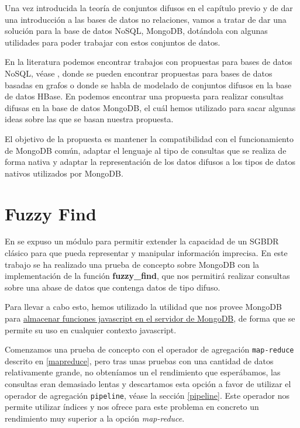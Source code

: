 \label{propuesta}
Una vez introducida la teoría de conjuntos difusos en el capítulo previo y de dar una introducción a las bases de datos no relaciones, vamos a tratar de dar una solución para la base de datos NoSQL, MongoDB, dotándola con algunas utilidades para poder trabajar con estos conjuntos de datos.

En la literatura podemos encontrar trabajos con propuestas para bases de datos NoSQL, véase \cite{fuzzyquerygraph, fuzzyquerygraph2, fuzzyquerygraph3}, donde se pueden encontrar propuestas para bases de datos basadas en grafos o \cite{fuzzyqueryhbase} donde se habla de modelado de conjuntos difusos en la base de datos HBase. En \cite{fuzzyquerymongo} podemos encontrar una propuesta para realizar consultas difusas en la base de datos MongoDB, el cuál hemos utilizado para sacar algunas ideas sobre las que se basan nuestra propuesta.

El objetivo de la propuesta es mantener la compatibilidad con el funcionamiento de MongoDB común, adaptar el lenguaje al tipo de consultas que se realiza de forma nativa y adaptar la representación de los datos difusos a los tipos de datos nativos utilizados por MongoDB.

\section{Fuzzy Find}

En \cite{tesismedina} se expuso un módulo para permitir extender la capacidad de un SGBDR clásico para que pueda representar y manipular información imprecisa. En este trabajo se ha realizado una prueba de concepto sobre MongoDB con la implementación de la función \textbf{fuzzy\_find}, que nos permitirá realizar consultas sobre una abase de datos que contenga datos de tipo difuso.

Para llevar a cabo esto, hemos utilizado la utilidad que nos provee MongoDB para \href{https://docs.mongodb.com/manual/tutorial/store-javascript-function-on-server/}{almacenar funciones javascript en el servidor de MongoDB}, de forma que se permite su uso en cualquier contexto javascript.

Comenzamos una prueba de concepto con el operador de agregación \texttt{map-reduce} descrito en \ref{mapreduce}, pero tras unas pruebas con una cantidad de datos relativamente grande, no obteníamos un el rendimiento que esperábamos, las consultas eran demasiado lentas y descartamos esta opción a favor de utilizar el operador de agregación \texttt{pipeline}, véase la sección \ref{pipeline}. Este operador nos permite utilizar índices y nos ofrece para este problema en concreto un rendimiento muy superior a la opción \textit{map-reduce}.

